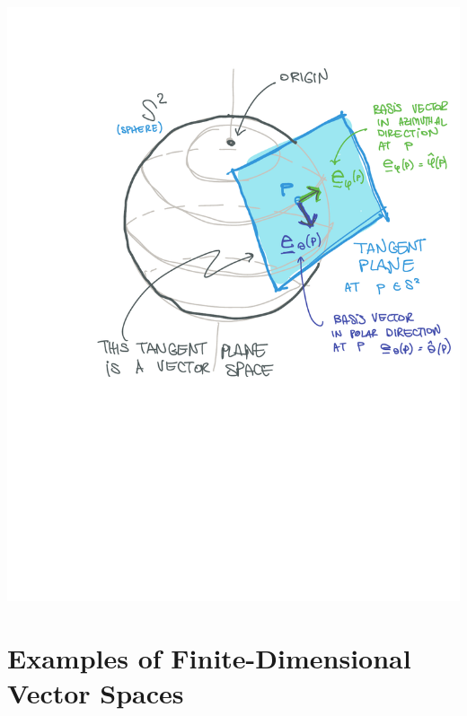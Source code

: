 \documentclass[
  11pt,
	colorful,
	raggedright,
]{tufte-style-thesis-flip}
\begin{document}
\begin{center}
\includegraphics[width=.7\textwidth]{figures/Lec_2021_tangentS2.pdf}
\end{center}


\section{Examples of Finite-Dimensional Vector Spaces}
\end{document}

